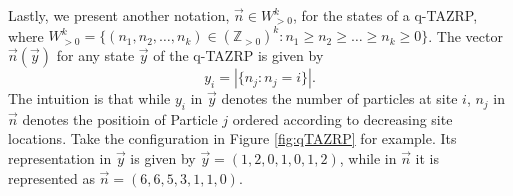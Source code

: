 Lastly, we present another notation, $\vec{n} \in W^k_{>0}$, for the states of a q-TAZRP, where $W^k_{>0} = \{(n_1,n_2,\dots,n_k) \in (\mathbb{Z}_{>0})^k : n_1 \ge n_2 \ge \dots \ge n_k \ge 0 \}$. The vector $\vec{n}(\vec{y})$ for any state $\vec{y}$ of the q-TAZRP is given by $$y_i = \left| \{ n_j : n_j = i \} \right|.$$ The intuition is that while $y_i$ in $\vec{y}$ denotes the number of particles at site $i$, $n_j$ in $\vec{n}$ denotes the positioin of Particle $j$ ordered according to decreasing site locations. Take the configuration in Figure \ref{fig:qTAZRP} for example. Its representation in $\vec{y}$ is given by $\vec{y} = (1,2,0,1,0,1,2)$, while in $\vec{n}$ it is represented as $\vec{n} = (6,6,5,3,1,1,0)$. 
